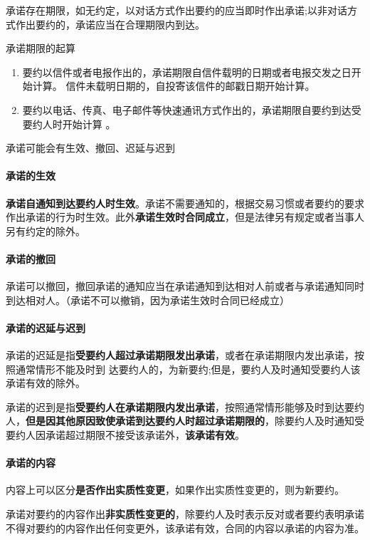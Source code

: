 \documentclass[UTF8,12pt]{ctexart}
\numberwithin{equation}{section} %
\numberwithin{figure}{section}
\numberwithin{table}{section}
\begin{document}
	承诺存在期限，如无约定，以对话方式作出要约的应当即时作出承诺;以非对话方式作出要约的，承诺应当在合理期限内到达。
	 
	承诺期限的起算 
	\begin{enumerate}
		\item 要约以信件或者电报作出的，承诺期限自信件载明的日期或者电报交发之日开始计算。 信件未载明日期的，自投寄该信件的邮戳日期开始计算。
		
		\item 要约以电话、传真、电子邮件等快速通讯方式作出的，承诺期限自要约到达受要约人时开始计算 。
	\end{enumerate}
	
	承诺可能会有生效、撤回、迟延与迟到
	
	\paragraph{承诺的生效} 
	\textbf{承诺自通知到达要约人时生效}。承诺不需要通知的，根据交易习惯或者要约的要求作出承诺的行为时生效。此外\textbf{承诺生效时合同成立}，但是法律另有规定或者当事人另有约定的除外。
	
	\paragraph{承诺的撤回} 承诺可以撤回，撤回承诺的通知应当在承诺通知到达相对人前或者与承诺通知同时到达相对人。（承诺不可以撤销，因为承诺生效时合同已经成立）
	
	
	\paragraph{承诺的迟延与迟到} 
	承诺的迟延是指\textbf{受要约人超过承诺期限发出承诺}，或者在承诺期限内发出承诺，按照通常情形不能及时到 达要约人的，为新要约;但是，要约人及时通知受要约人该承诺有效的除外。
	
	承诺的迟到是指\textbf{受要约人在承诺期限内发出承诺}，按照通常情形能够及时到达要约人，\textbf{但是因其他原因致使承诺到达要约人时超过承诺期限的}，除要约人及时通知受要约人因承诺超过期限不接受该承诺外，\textbf{该承诺有效}。
	
	\paragraph{承诺的内容}
	内容上可以区分\textbf{是否作出实质性变更}，如果作出实质性变更的，则为新要约。
	
	承诺对要约的内容作出\textbf{非实质性变更的}，除要约人及时表示反对或者要约表明承诺不得对要约的内容作出任何变更外，该承诺有效，合同的内容以承诺的内容为准。
	
\end{document}
